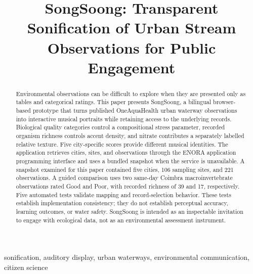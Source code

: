 \documentclass[conference]{IEEEtran}
\begin{document}
\title{SongSoong: Transparent Sonification of Urban Stream Observations for Public Engagement}

\author{
}

\maketitle

\begin{abstract}
Environmental observations can be difficult to explore when they are presented only as tables and categorical ratings. This paper presents SongSoong, a bilingual browser-based prototype that turns published OneAquaHealth urban waterway observations into interactive musical portraits while retaining access to the underlying records. Biological quality categories control a compositional stress parameter, recorded organism richness controls accent density, and nitrate contributes a separately labelled relative texture. Five city-specific scores provide different musical identities. The application retrieves cities, sites, and observations through the ENORA application programming interface and uses a bundled snapshot when the service is unavailable. A snapshot examined for this paper contained five cities, 106 sampling sites, and 221 observations. A guided comparison uses two same-day Coimbra macroinvertebrate observations rated Good and Poor, with recorded richness of 39 and 17, respectively. Five automated tests validate mapping and record-selection behavior. These tests establish implementation consistency; they do not establish perceptual accuracy, learning outcomes, or water safety. SongSoong is intended as an inspectable invitation to engage with ecological data, not as an environmental assessment instrument.
\end{abstract}

\begin{IEEEkeywords}
sonification, auditory display, urban waterways, environmental communication, citizen science
\end{IEEEkeywords}
\end{document}
